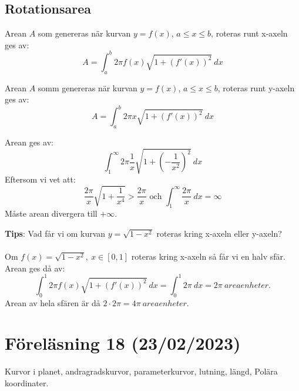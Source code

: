 \documentclass{report}
\begin{document}
\subsection{Rotationsarea}
{
Arean $ A $ som genereras när kurvan $ y = f(x) $, $ a \le x \le b $, roteras runt x-axeln ges av:
\begin{equation*}
A = \int_{a}^{b} 2 \pi f(x) \sqrt{1 + ( f'(x))^2}  \: dx 
\end{equation*}
}

{
Arean $ A $ somm genereras när kurvan $ y = f(x) $, $ a \le x \le b $, roteras runt y-axeln ges av:
\begin{equation*}
A = \int_{a}^{b} 2 \pi x \sqrt{1 + (f'(x))^2}  \: dx 
\end{equation*}
}

{
Arean ges av:
\begin{equation*}
\int_{1}^{ \infty} 2\pi \frac{1}{x} \sqrt{1 + ( - \frac{1}{x^2}  )^2}  \: dx 
\end{equation*}
Eftersom vi vet att:
\begin{equation*}
\frac{2\pi}{x} \sqrt{1 + \frac{1}{x^4} } > \frac{2\pi}{x} \text{ och } \int_{1}^{ \infty} \frac{2\pi}{x}  \: dx = \infty 
\end{equation*}
Måste arean divergera till $ + \infty $.
}

{
\textbf{Tips}: Vad får vi om kurvan $ y = \sqrt{1 - x^2}  $ roteras kring x-axeln eller y-axeln?\\\\

Om $ f(x) = \sqrt{1 - x^2},\: x \in [0,1] $ roteras kring x-axeln så får vi en halv sfär. Arean ges då av:
\begin{equation*}
\int_{0}^{1} 2\pi f(x) \sqrt{1+(f'(x))^2}  \: dx = \int_{0}^{1} 2 \pi \: dx = 2\pi \: areaenheter.  
\end{equation*}
Arean av hela sfären är då $ 2 \cdot 2\pi = 4\pi \: areaenheter. $ 
}

\pagebreak
\section{Föreläsning 18 (23/02/2023)}
Kurvor i planet, andragradskurvor, parameterkurvor, lutning, längd, Polära koordinater.\\\\
\end{document}
